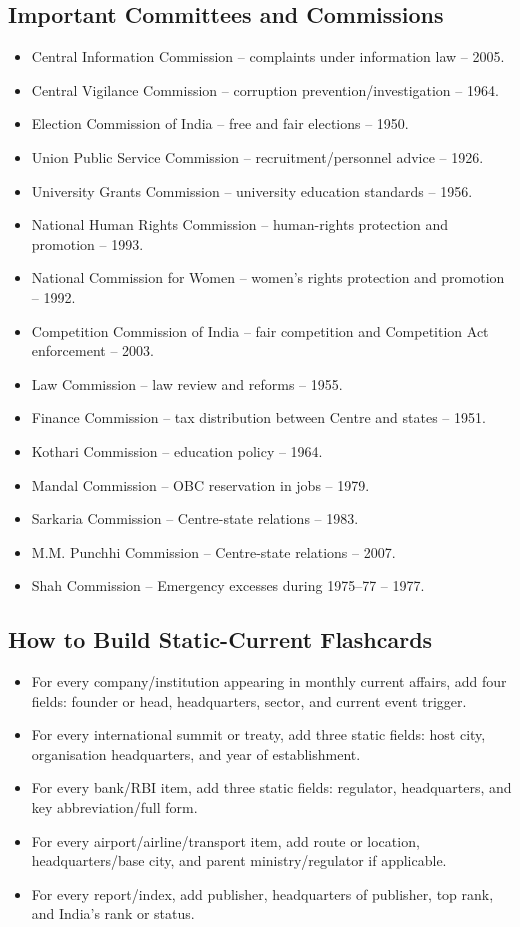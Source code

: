 \documentclass[10pt,a4paper]{article}
\begin{document}
\subsection{Important Committees and Commissions}
\begin{itemize}
    \item Central Information Commission -- complaints under information law -- 2005.
    \item Central Vigilance Commission -- corruption prevention/investigation -- 1964.
    \item Election Commission of India -- free and fair elections -- 1950.
    \item Union Public Service Commission -- recruitment/personnel advice -- 1926.
    \item University Grants Commission -- university education standards -- 1956.
    \item National Human Rights Commission -- human-rights protection and promotion -- 1993.
    \item National Commission for Women -- women's rights protection and promotion -- 1992.
    \item Competition Commission of India -- fair competition and Competition Act enforcement -- 2003.
    \item Law Commission -- law review and reforms -- 1955.
    \item Finance Commission -- tax distribution between Centre and states -- 1951.
    \item Kothari Commission -- education policy -- 1964.
    \item Mandal Commission -- OBC reservation in jobs -- 1979.
    \item Sarkaria Commission -- Centre-state relations -- 1983.
    \item M.M. Punchhi Commission -- Centre-state relations -- 2007.
    \item Shah Commission -- Emergency excesses during 1975--77 -- 1977.
\end{itemize}

\subsection{How to Build Static-Current Flashcards}
\begin{itemize}
    \item For every company/institution appearing in monthly current affairs, add four fields: founder or head, headquarters, sector, and current event trigger.
    \item For every international summit or treaty, add three static fields: host city, organisation headquarters, and year of establishment.
    \item For every bank/RBI item, add three static fields: regulator, headquarters, and key abbreviation/full form.
    \item For every airport/airline/transport item, add route or location, headquarters/base city, and parent ministry/regulator if applicable.
    \item For every report/index, add publisher, headquarters of publisher, top rank, and India's rank or status.
\end{itemize}
\end{document}
